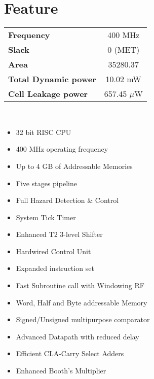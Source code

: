 \chapter{Feature}
\begin{center}

\vfill
\begin{tabular}{ l c }
	\textbf{Frequency} & 400 MHz \\ 
	\textbf{Slack} & 0 (MET) \\  
	\textbf{Area} & 35280.37 \\  
	\textbf{Total Dynamic power} & 10.02 mW \\  
	\textbf{Cell Leakage power} & 657.45 $\mu$W
\end{tabular}

\end{center}
\hfill
\\[60pt]
\hfill

\begin{multicols}{2}
\begin{itemize}
\item 32 bit RISC CPU
\item 400 MHz operating frequency
\item Up to 4 GB of Addressable Memories
\item Five stages pipeline
\item Full Hazard Detection \& Control
\item System Tick Timer
\item Enhanced T2 3-level Shifter
\item Hardwired Control Unit
\end{itemize}

\columnbreak

\begin{itemize}
\item Expanded instruction set
\item Fast Subroutine call with Windowing RF
\item Word, Half and Byte addressable Memory
\item Signed/Unsigned multipurpose comparator
\item Advanced Datapath with reduced delay
\item Efficient CLA-Carry Select Adders
\item Enhanced Booth's Multiplier
\end{itemize}
\end{multicols}
\vfill